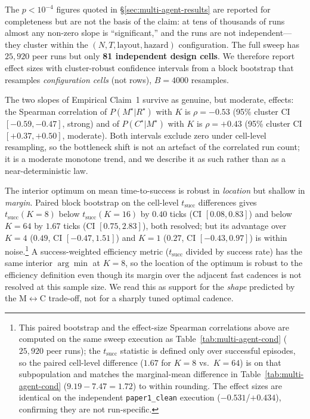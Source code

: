 \documentclass{article}
\begin{document}
The $p<10^{-4}$ figures quoted in \S\ref{sec:multi-agent-results} are reported for completeness but are not the basis of the claim: at tens of thousands of runs almost any non-zero slope is ``significant,'' and the runs are not independent---they cluster within the $(N,T,\text{layout},\text{hazard})$ configuration. The full sweep has $25{,}920$ peer runs but only \textbf{81 independent design cells}. We therefore report effect sizes with cluster-robust confidence intervals from a block bootstrap that resamples \emph{configuration cells} (not rows), $B{=}4000$ resamples.

The two slopes of Empirical Claim~1 survive as genuine, but moderate, effects: the Spearman correlation of $P(M^\star|R^\star)$ with $K$ is $\rho=-0.53$ (95\% cluster CI $[-0.59,-0.47]$, strong) and of $P(C^\star|M^\star)$ with $K$ is $\rho=+0.43$ (95\% cluster CI $[+0.37,+0.50]$, moderate). Both intervals exclude zero under cell-level resampling, so the bottleneck shift is not an artefact of the correlated run count; it is a moderate monotone trend, and we describe it as such rather than as a near-deterministic law.

The interior optimum on mean time-to-success is robust in \emph{location} but shallow in \emph{margin}. Paired block bootstrap on the cell-level $t_{\mathrm{succ}}$ differences gives $t_{\mathrm{succ}}(K{=}8)$ below $t_{\mathrm{succ}}(K{=}16)$ by $0.40$ ticks (CI $[0.08,0.83]$) and below $K{=}64$ by $1.67$ ticks (CI $[0.75,2.83]$), both resolved; but its advantage over $K{=}4$ ($0.49$, CI $[-0.47,1.51]$) and $K{=}1$ ($0.27$, CI $[-0.43,0.97]$) is within noise.\footnote{This paired bootstrap and the effect-size Spearman correlations above are computed on the same sweep execution as Table~\ref{tab:multi-agent-cond} ($25{,}920$ peer runs); the $t_{\mathrm{succ}}$ statistic is defined only over successful episodes, so the paired cell-level difference ($1.67$ for $K{=}8$ vs.\ $K{=}64$) is on that subpopulation and matches the marginal-mean difference in Table~\ref{tab:multi-agent-cond} ($9.19{-}7.47{=}1.72$) to within rounding. The effect sizes are identical on the independent \texttt{paper1\_clean} execution ($-0.531$/$+0.434$), confirming they are not run-specific.} A success-weighted efficiency metric ($t_{\mathrm{succ}}$ divided by success rate) has the same interior $\arg\min$ at $K{=}8$, so the location of the optimum is robust to the efficiency definition even though its margin over the adjacent fast cadences is not resolved at this sample size. We read this as support for the \emph{shape} predicted by the M$\leftrightarrow$C trade-off, not for a sharply tuned optimal cadence.
\end{document}
